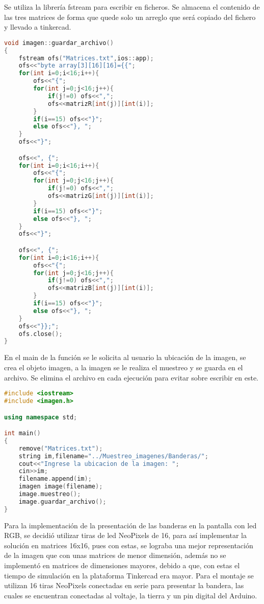 \documentclass{article}
\begin{document}
Se utiliza la librería fstream para escribir en ficheros. Se almacena el contenido de las tres matrices de forma que quede solo un arreglo que será copiado del fichero y llevado a tinkercad.

\begin{lstlisting}[language=C++, label=Guardar archivo]
void imagen::guardar_archivo()
{
    fstream ofs("Matrices.txt",ios::app);
    ofs<<"byte array[3][16][16]={{";
    for(int i=0;i<16;i++){
        ofs<<"{";
        for(int j=0;j<16;j++){
            if(j!=0) ofs<<",";
            ofs<<matrizR[int(j)][int(i)];
        }
        if(i==15) ofs<<"}";
        else ofs<<"}, ";
    }
    ofs<<"}";

    ofs<<", {";
    for(int i=0;i<16;i++){
        ofs<<"{";
        for(int j=0;j<16;j++){
            if(j!=0) ofs<<",";
            ofs<<matrizG[int(j)][int(i)];
        }
        if(i==15) ofs<<"}";
        else ofs<<"}, ";
    }
    ofs<<"}";

    ofs<<", {";
    for(int i=0;i<16;i++){
        ofs<<"{";
        for(int j=0;j<16;j++){
            if(j!=0) ofs<<",";
            ofs<<matrizB[int(j)][int(i)];
        }
        if(i==15) ofs<<"}";
        else ofs<<"}, ";
    }
    ofs<<"}};";
    ofs.close();
}

\end{lstlisting}

En el main de la función se le solicita al usuario la ubicación de la imagen, se crea el objeto imagen, a la imagen se le realiza el muestreo y se guarda en el archivo. Se elimina el archivo en cada ejecución para evitar sobre escribir en este.
\begin{lstlisting}[language=C++, label=main]
#include <iostream>
#include <imagen.h>

using namespace std;

int main()
{
    remove("Matrices.txt");
    string im,filename="../Muestreo_imagenes/Banderas/";
    cout<<"Ingrese la ubicacion de la imagen: ";
    cin>>im;
    filename.append(im);
    imagen image(filename);
    image.muestreo();
    image.guardar_archivo();
}
\end{lstlisting}

Para la implementación de la presentación de las banderas en la pantalla con led RGB, se decidió utilizar tiras de led NeoPixels de 16, para así implementar la solución en matrices 16x16, pues con estas, se lograba una mejor representación de la imagen que con unas matrices de menor dimensión, además no se implementó en matrices de dimensiones mayores, debido a que, con estas el tiempo de simulación en la plataforma Tinkercad era mayor.
Para el montaje se utilizan 16 tiras NeoPixels conectadas en serie para presentar la bandera, las cuales se encuentran conectadas al voltaje, la tierra y un pin digital del Arduino.
\end{document}
